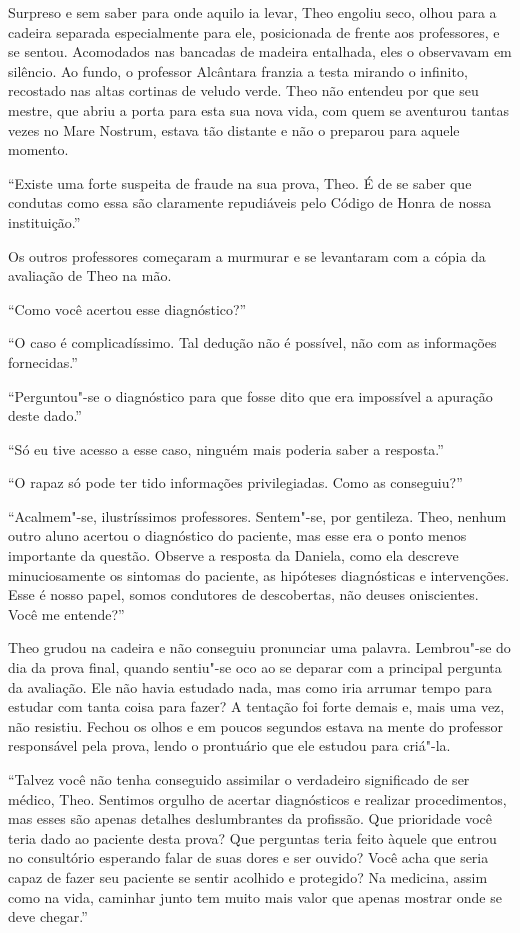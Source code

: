 Surpreso e sem saber para onde aquilo ia levar, Theo engoliu seco, olhou
para a cadeira separada especialmente para ele, posicionada de frente
aos professores, e se sentou. Acomodados nas bancadas de madeira
entalhada, eles o observavam em silêncio. Ao fundo, o professor
Alcântara franzia a testa mirando o infinito, recostado nas altas
cortinas de veludo verde. Theo não entendeu por que seu mestre, que abriu
a porta para esta sua nova vida, com quem se aventurou tantas vezes no Mare
Nostrum, estava tão distante e não o preparou para aquele momento.

``Existe uma forte suspeita de fraude na sua prova, Theo. É de se saber
que condutas como essa são claramente repudiáveis pelo Código de Honra
de nossa instituição.''

Os outros professores começaram a murmurar e se levantaram com a cópia
da avaliação de Theo na mão.

``Como você acertou esse diagnóstico?''

``O caso é complicadíssimo. Tal dedução não é possível, não com as
informações fornecidas.''

``Perguntou"-se o diagnóstico para que fosse dito que era impossível a
apuração deste dado.''

``Só eu tive acesso a esse caso, ninguém mais poderia saber a
resposta.''

``O rapaz só pode ter tido informações privilegiadas. Como as
conseguiu?''

``Acalmem"-se, ilustríssimos professores. Sentem"-se, por gentileza. Theo,
nenhum outro aluno acertou o diagnóstico do paciente, mas esse era o
ponto menos importante da questão. Observe a resposta da Daniela, como
ela descreve minuciosamente os sintomas do paciente, as hipóteses
diagnósticas e intervenções. Esse é nosso papel, somos condutores de
descobertas, não deuses oniscientes. Você me entende?''

Theo grudou na cadeira e não conseguiu pronunciar uma palavra.
Lembrou"-se do dia da prova final, quando sentiu"-se oco ao se deparar
com a principal pergunta da avaliação. Ele não havia estudado nada,
mas como iria arrumar tempo para estudar com tanta coisa para fazer?
A tentação foi forte demais e, mais uma vez, não resistiu. Fechou os
olhos e em poucos segundos estava na mente do professor responsável pela
prova, lendo o prontuário que ele estudou para criá"-la.

``Talvez você não tenha conseguido assimilar o verdadeiro significado de
ser médico, Theo. Sentimos orgulho de acertar diagnósticos e realizar
procedimentos, mas esses são apenas detalhes deslumbrantes da profissão.
Que prioridade você teria dado ao paciente desta prova? Que perguntas
teria feito àquele que entrou no consultório esperando falar de suas
dores e ser ouvido? Você acha que seria capaz de fazer seu paciente se
sentir acolhido e protegido? Na medicina, assim como na vida, caminhar
junto tem muito mais valor que apenas mostrar onde se deve chegar.''

